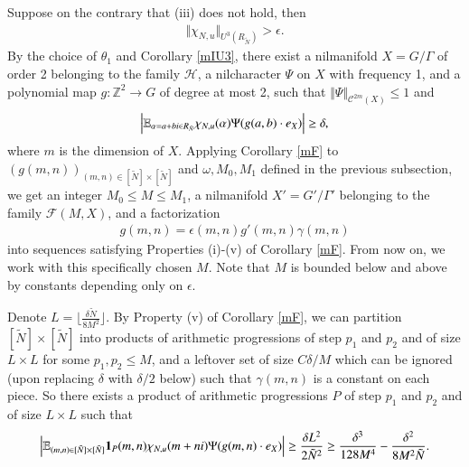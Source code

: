 \documentclass[12pt,amstex]{amsart}
\theoremstyle{definition}
\def \A {\alpha}
\def \d {\delta}
\def \e {\epsilon}
\def \R {R_{\tilde{N}}}
\begin{document}
Suppose on the contrary that (iii) does not hold, then
  \begin{equation}\nonumber
   \begin{split}
   \Vert\chi_{N,u}\Vert_{U^{3}(\R)}>\e.
   \end{split}
  \end{equation}
By the choice of $\theta_{1}$ and Corollary \ref{mIU3}, there exist a nilmanifold $X=G/\Gamma$ of order 2 belonging to the family $\mathcal{H}$, a nilcharacter $\Psi$ on $X$ with frequency 1, and a polynomial map $g\colon\mathbb{Z}^{2}\rightarrow G$ of degree at most 2, such that $\Vert\Psi\Vert_{\mathcal{C}^{2m}(X)}\leq 1$ and
  \begin{equation}\nonumber
   \begin{split}
   \Bigl\vert\mathbb{E}_{\A=a+bi\in \R}\chi_{N,u}(\A)\Psi(g(a,b)\cdot e_{X})\Bigr\vert\geq\d,
   \end{split}
  \end{equation}
  where $m$ is the dimension of $X$. Applying Corollary \ref{mF} to $(g(m,n))_{(m,n)\in [\tilde{N}]\times[\tilde{N}]}$ and $\omega, M_{0}, M_{1}$ defined in the previous subsection, we get an integer $M_{0}\leq M\leq M_{1}$, a nilmanifold $X'=G'/\Gamma'$ belonging to the family $\mathcal{F}(M,X)$, and a factorization
    \begin{equation}\nonumber
   \begin{split}
   g(m,n)=\e(m,n)g'(m,n)\gamma(m,n)
   \end{split}
  \end{equation}
  into sequences satisfying Properties (i)-(v) of Corollary \ref{mF}. From now on, we work with this specifically chosen $M$. Note that $M$ is bounded below and above by constants depending only on $\e$.

  Denote $L=\lfloor\frac{\d\tilde{N}}{8M^{2}}\rfloor$. By Property (v) of Corollary \ref{mF}, we can partition $[\tilde{N}]\times[\tilde{N}]$ into products of arithmetic progressions of step $p_{1}$ and $p_{2}$ and of size $L\times L$ for some $p_{1},p_{2}\leq M$, and a leftover set of size $C\d/M$ which can be ignored (upon replacing $\d$ with $\d/2$ below) such that $\gamma(m,n)$ is a constant on each piece. So there exists a product of arithmetic progressions $P$ of step $p_{1}$ and $p_{2}$ and of size $L\times L$ such that
  \begin{equation}\nonumber
   \begin{split}
   \Bigl\vert\mathbb{E}_{(m,n)\in [\tilde{N}]\times[\tilde{N}]}\bold{1}_{P}(m,n)\chi_{N,u}(m+ni)\Psi(g(m,n)\cdot e_{X})\Bigr\vert\geq\frac{\d L^{2}}{2\tilde{N}^{2}}\geq
   \frac{\d^{3}}{128M^{4}}-\frac{\d^{2}}{8M^{2}\tilde{N}}.
   \end{split}
  \end{equation}
\end{document}
